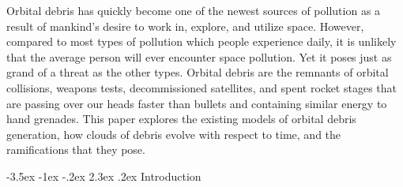 \documentclass[a4paper, 12pt]{article}
\makeatletter
\renewcommand\section{\clearpage\newpage\@startsection {section}{1}{\z@}%
	{-3.5ex \@plus -1ex \@minus -.2ex}%
	{2.3ex \@plus.2ex}%
	{\normalfont\Large\bfseries}}
\makeatother
\begin{document}
\myskip
\doublespace
Orbital debris has quickly become one of the newest sources of pollution as a result of mankind's desire to work in, explore, and utilize space. However, compared to most types of pollution which people experience daily, it is unlikely that the average person will ever encounter space pollution. Yet it poses just as grand of a threat as the other types. Orbital debris are the remnants of orbital collisions, weapons tests, decommissioned satellites, and spent rocket stages that are passing over our heads faster than bullets and containing similar energy to hand grenades. This paper explores the existing models of orbital debris generation, how clouds of debris evolve with respect to time, and the ramifications that they pose.
\singlespace
\newpage


\tableofcontents

\cleardoublepage
{}\listoffigures

\cleardoublepage
{}\listoftables

\glsaddall
\cleardoublepage
{}\printglossary[title={List of Symbols}, nonumberlist]

\newpage
\setlength{\parindent}{1em}



\section{Introduction}
\label{introduction}
\doublespace
\end{document}
